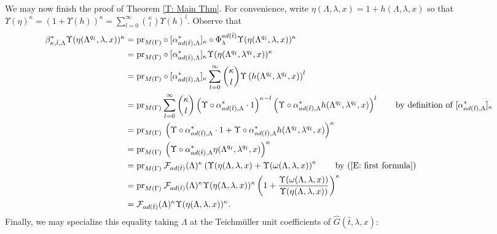 \documentclass{article}
\theoremstyle{remark}
\def\c #1{ {\mathcal #1} }
\begin{document}
\bigskip{} We may now finish the proof of Theorem \ref{T: Main Thm}. For convenience, write $\eta(\Lambda, \lambda, x) = 1 + h(\Lambda, \lambda, x)$ so that $\Upsilon(\eta)^\kappa = (1 + \Upsilon(h))^\kappa = \sum_{l=0}^\infty  \binom{\kappa}{l} \Upsilon(h)^l$. Observe that 
\begin{align*}
\beta_{\kappa, \bar t, \Lambda}^* \Upsilon(\eta(\Lambda^{q_{\bar t}}, \lambda, x))^\kappa &= \text{pr}_{M(\Gamma)} \circ [\alpha_{a d(\bar t), \Lambda}^*]_\kappa \circ \Phi_\lambda^{a d(\bar t)} \Upsilon(\eta(\Lambda^{q_{\bar t}}, \lambda, x))^\kappa \\
&= \text{pr}_{M(\Gamma)} \circ [\alpha_{a d(\bar t), \Lambda}^*]_\kappa \Upsilon(\eta(\Lambda^{q_{\bar t}}, \lambda^{q_{\bar t}}, x))^\kappa \\
&= \text{pr}_{M(\Gamma)} \circ [\alpha_{a d(\bar t), \Lambda}^*]_\kappa  \sum_{l=0}^\infty \binom{\kappa}{l} \Upsilon \left( h(\Lambda^{q_{\bar t}}, \lambda^{q_{\bar t}}, x)  \right)^l \\
&= \text{pr}_{M(\Gamma)} \sum_{l=0}^\infty \binom{\kappa}{l} \left(\Upsilon \circ \alpha_{a d(\bar t), \Lambda}^* \cdot 1 \right)^{\kappa - l} \left(\Upsilon \circ  \alpha_{a d(\bar t), \Lambda}^* h(\Lambda^{q_{\bar t}}, \lambda^{q_{\bar t}}, x) \right)^l \qquad \text{by definition of $ [\alpha_{a d(\bar t), \Lambda}^*]_\kappa$} \\
&= \text{pr}_{M(\Gamma)} \> \left( \Upsilon \circ  \alpha_{a d(\bar t), \Lambda}^* \cdot 1 + \Upsilon \circ  \alpha_{a d(\bar t), \Lambda}^* h(\Lambda^{q_{\bar t}}, \lambda^{q_{\bar t}}, x) \right)^\kappa \\
&= \text{pr}_{M(\Gamma)} \>  \left( \Upsilon \circ  \alpha_{a d(\bar t), \Lambda}^* \eta(\Lambda^{q_{\bar t}}, \lambda^{q_{\bar t}}, x) \right)^\kappa \\
&= \text{pr}_{M(\Gamma)} \>  \c F_{a d(\bar t)}(\Lambda)^\kappa \left( \Upsilon(\eta(\Lambda, \lambda, x) + \Upsilon(\omega(\Lambda, \lambda, x)  \right)^\kappa \qquad \text{by } (\ref{E: first formula}) \\
&= \text{pr}_{M(\Gamma)} \>  \c F_{a d(\bar t)}(\Lambda)^\kappa \Upsilon(\eta(\Lambda, \lambda, x))^\kappa \left( 1 + \frac{\Upsilon(\omega(\Lambda, \lambda, x))}{\Upsilon( \eta(\Lambda, \lambda, x))}  \right)^\kappa \\
&= \c F_{a d(\bar t)}(\Lambda)^\kappa \Upsilon(\eta(\Lambda, \lambda, x))^\kappa.
\end{align*}
Finally, we may specialize this equality taking  $\Lambda$ at the Teichm\"uller unit coefficients of $\hat G(\hat t, \lambda, x)$:
\end{document}
